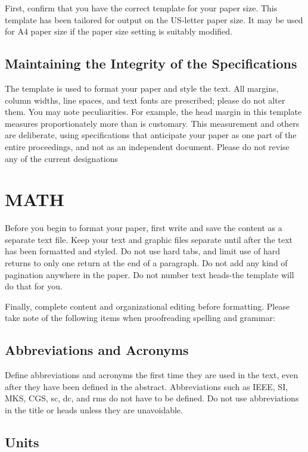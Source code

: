 \documentclass[letterpaper, 10 pt, conference]{ieeeconf}  %
\begin{document}
	First, confirm that you have the correct template for your paper size. This template has been tailored for output on the US-letter paper size. 
	It may be used for A4 paper size if the paper size setting is suitably modified.
	
	\subsection{Maintaining the Integrity of the Specifications}
	
	The template is used to format your paper and style the text. All margins, column widths, line spaces, and text fonts are prescribed; please do not alter them. You may note peculiarities. For example, the head margin in this template measures proportionately more than is customary. This measurement and others are deliberate, using specifications that anticipate your paper as one part of the entire proceedings, and not as an independent document. Please do not revise any of the current designations
	
	\section{MATH}
	
	Before you begin to format your paper, first write and save the content as a separate text file. Keep your text and graphic files separate until after the text has been formatted and styled. Do not use hard tabs, and limit use of hard returns to only one return at the end of a paragraph. Do not add any kind of pagination anywhere in the paper. Do not number text heads-the template will do that for you.
	
	Finally, complete content and organizational editing before formatting. Please take note of the following items when proofreading spelling and grammar:
	
	\subsection{Abbreviations and Acronyms} Define abbreviations and acronyms the first time they are used in the text, even after they have been defined in the abstract. Abbreviations such as IEEE, SI, MKS, CGS, sc, dc, and rms do not have to be defined. Do not use abbreviations in the title or heads unless they are unavoidable.
	
	\subsection{Units}
	
\end{document}
